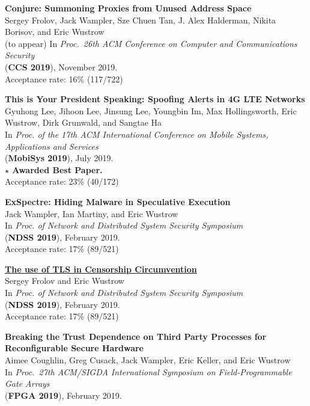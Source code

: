 \documentclass[margin,11pt]{res} %
\begin{document}
    \textbf{Conjure: Summoning Proxies from Unused Address Space} \\
    Sergey Frolov, Jack Wampler, Sze Chuen Tan, J. Alex Halderman, Nikita Borisov, and Eric Wustrow \\
    (to appear) In \emph{Proc.\ 26th ACM Conference on Computer and Communications Security} \\
    (\textbf{CCS 2019}), November 2019. \\
    Acceptance rate: 16\% (117/722)

    \textbf{This is Your President Speaking: Spoofing Alerts in 4G LTE Networks} \\
    Gyuhong Lee, Jihoon Lee, Jinsung Lee, Youngbin Im, Max Hollingsworth, Eric Wustrow, Dirk Grunwald, and Sangtae Ha \\
    In \emph{Proc. of the 17th ACM International Conference on Mobile Systems, Applications and Services} \\
    (\textbf{MobiSys 2019}), July 2019. \\
    \textbf{$\star$ Awarded Best Paper.} \\
    Acceptance rate: 23\% (40/172)

    \textbf{ExSpectre: Hiding Malware in Speculative Execution} \\
    Jack Wampler, Ian Martiny, and Eric Wustrow \\
    In \emph{Proc. of Network and Distributed System Security Symposium} \\
    (\textbf{NDSS 2019}), February 2019. \\
    Acceptance rate: 17\% (89/521)

    \textbf{\href{https://tlsfingerprint.io}{The use of TLS in Censorship Circumvention}} \\
    Sergey Frolov and Eric Wustrow \\
    In \emph{Proc. of Network and Distributed System Security Symposium} \\
    (\textbf{NDSS 2019}), February 2019. \\
    Acceptance rate: 17\% (89/521)


    \textbf{Breaking the Trust Dependence on Third Party Processes for Reconfigurable Secure Hardware} \\
    Aimee Coughlin, Greg Cusack, Jack Wampler, Eric Keller, and Eric Wustrow \\
    In \emph{Proc.\ 27th ACM/SIGDA International Symposium on Field-Programmable Gate Arrays}\\
    (\textbf{FPGA 2019}), February 2019. \\
\end{document}

